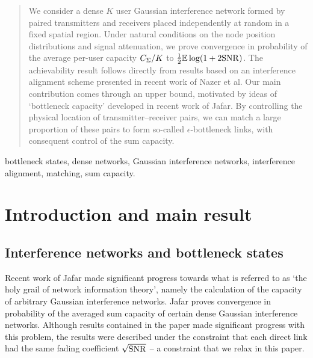 \documentclass[journal]{IEEEtran}
\begin{document}
\begin{abstract}
 We consider a dense 
$K$ user Gaussian interference network formed by paired transmitters and
receivers placed independently at random in a fixed spatial 
region. Under natural conditions on the 
node position distributions and signal attenuation, we
prove convergence in probability of the average per-user capacity $C_{\Sigma}/K$ to
$\frac{1}{2} {\mathbb {E}} \log(1 + 2 {\rm{SNR}})$.
The achievability result follows directly from results based on an interference
alignment scheme presented in recent work of Nazer et al. Our main contribution comes through an upper bound, motivated by ideas of `bottleneck 
capacity' developed in recent work of Jafar. By controlling the physical
location of transmitter--receiver pairs, we can match a large proportion of 
these pairs to form so-called $\epsilon$-bottleneck links, with consequent 
control of the sum capacity.
\end{abstract}
%

\begin{IEEEkeywords}
bottleneck states,
dense networks, Gaussian interference networks,
interference alignment, matching, sum capacity.
\end{IEEEkeywords}
\section{Introduction and main result}
%
\subsection{Interference networks and bottleneck states}
%
Recent work of Jafar \cite{jafar} made significant progress towards
what is referred to as `the holy grail of network information theory', namely
the calculation of the capacity of arbitrary Gaussian interference networks.
Jafar proves convergence in probability of the averaged sum capacity
of certain dense Gaussian interference networks. Although results contained in the
paper \cite{jafar} made significant progress with this problem, 
the results were described under
the constraint that each direct link had the same fading coefficient $\sqrt{{\rm{SNR}}}$ --
a constraint that we relax in this paper. 
\end{document}
